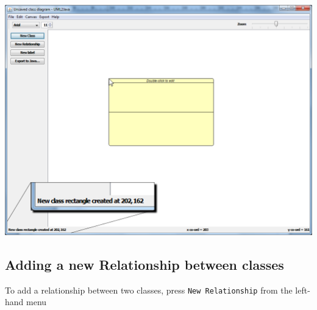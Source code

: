 \documentclass[a4paper]{article}
\begin{document}
\begin{center}\includegraphics[trim = 0pt 0pt 500pt 675pt , clip, scale=0.7]{./images/addnewclass3.png} \end{center}
\newpage
\subsection{Adding a new Relationship between classes}
To add a relationship between two classes, press \texttt{New Relationship} from the left-hand menu




\newpage
\printindex
\end{document}
